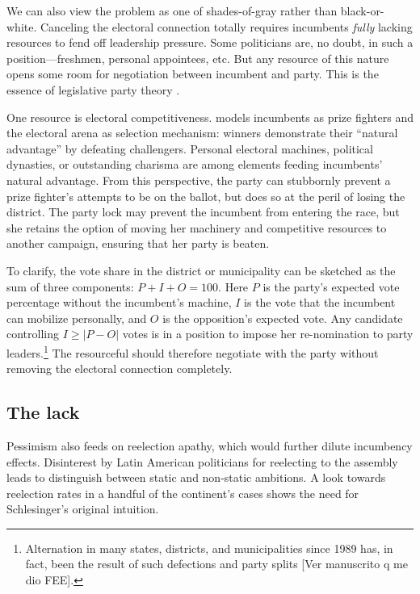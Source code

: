 \documentclass[letter,12pt]{article}
\begin{document}

We can also view the problem as one of shades-of-gray rather than black-or-white. Canceling the electoral connection totally requires incumbents \emph{fully} lacking resources to fend off leadership pressure. Some politicians are, no doubt, in such a position---freshmen, personal appointees, etc. But any resource of this nature opens some room for negotiation between incumbent and party. This is the essence of legislative party theory \citep{cox.mccubbins.2007leviath2nd,aldrich.rohdeCPG2001}.

One resource is electoral competitiveness. \citet{zallerprizeFighters} models incumbents as prize fighters and the electoral arena as selection mechanism: winners demonstrate their ``natural advantage'' by defeating challengers. Personal electoral machines, political dynasties, or outstanding charisma are among elements feeding incumbents' natural advantage. From this perspective, the party can stubbornly prevent a prize fighter's attempts to be on the ballot, but does so at the peril of losing the district. The party lock may prevent the incumbent from entering the race, but she retains the option of moving her machinery and competitive resources to another campaign, ensuring that her party is beaten.

To clarify, the vote share in the district or municipality can be sketched as the sum of three components: $P + I + O = 100$. Here $P$ is the party's expected vote percentage without the incumbent's machine, $I$ is the vote that the incumbent can mobilize personally, and $O$ is the opposition's expected vote. Any candidate controlling $I \ge |P-O|$ votes is in a position to impose her re-nomination to party leaders.\footnote{Alternation in many states, districts, and municipalities since 1989 has, in fact, been the result of such defections and party splits [Ver manuscrito q me dio FEE].} The resourceful should therefore negotiate with the party without removing the electoral connection completely.

\subsection{The lack}

Pessimism also feeds on reelection apathy, which would further dilute incumbency effects. Disinterest by Latin American politicians for reelecting to the assembly leads \citet{morgenstern.2002b} to distinguish between static and non-static ambitions. A look towards reelection rates in a handful of the continent's cases shows the need for Schlesinger's \citeyearpar{schlesinger.1966} original intuition.
\end{document}
